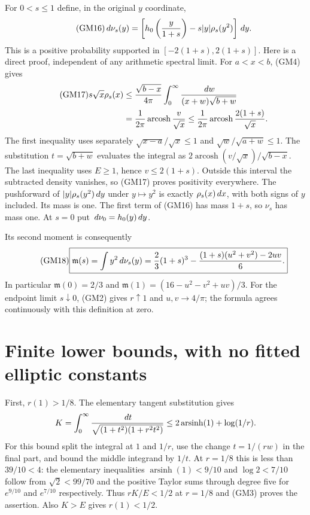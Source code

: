 For $0<s\le1$ define, in the original $y$ coordinate,
\begin{equation}\tag{GM16}
 \,d\nu_s(y)=\left[h_0\left(\frac y{1+s}\right)
                    -s|y|\rho_s(y^2)\right]\,d y.
\end{equation}
This is a positive probability supported in $[-2(1+s),2(1+s)]$.
Here is a direct proof, independent of any arithmetic spectral limit.
For $a<x<b$, (GM4) gives
\begin{align}\tag{GM17}
 s\sqrt x\rho_s(x)
 &\le\frac{\sqrt{b-x}}{4\pi}
          \int_0^\infty\frac{\,d w}{(x+w)\sqrt{b+w}}\notag\\
 &=\frac1{2\pi}\operatorname{arcosh}\frac v{\sqrt x}
 \le\frac1{2\pi}\operatorname{arcosh}\frac{2(1+s)}{\sqrt x}.\notag
\end{align}
The first inequality uses separately $\sqrt{x-a}/\sqrt x\le1$ and
$\sqrt w/\sqrt{a+w}\le1$. The substitution $t=\sqrt{b+w}$ evaluates
the integral as
$2\operatorname{arcosh}(v/\sqrt x)/\sqrt{b-x}$.
The last inequality uses $E\ge1$, hence $v\le2(1+s)$.
Outside this interval the subtracted density vanishes, so (GM17)
proves positivity everywhere. The pushforward of
$|y|\rho_s(y^2)\,d y$ under $y\mapsto y^2$ is exactly
$\rho_s(x)\,d x$, with both signs of $y$ included. Its mass is one.
The first term of (GM16) has mass $1+s$, so $\nu_s$ has mass one.
At $s=0$ put $\,d\nu_0=h_0(y)\,d y$.

Its second moment is consequently
\begin{equation}\tag{GM18}
 \boxed{\mathfrak m(s)=\int y^2\,d\nu_s(y)
 =\frac23(1+s)^3-\frac{(1+s)(u^2+v^2)-2uv}{6}.}
\end{equation}
In particular $\mathfrak m(0)=2/3$ and
$\mathfrak m(1)=(16-u^2-v^2+uv)/3$.
For the endpoint limit $s\downarrow0$, (GM2) gives
$r\uparrow1$ and $u,v\to4/\pi$; the formula agrees continuously
with this definition at zero.

\section{Finite lower bounds, with no fitted elliptic constants}
First, $r(1)>1/8$. The elementary tangent substitution gives
\[
 K=\int_0^\infty\frac{\,d t}{\sqrt{(1+t^2)(1+r^2t^2)}}
 \le2\operatorname{arsinh}(1)+\log(1/r).
\]
For this bound split the integral at $1$ and $1/r$, use the change
$t=1/(rw)$ in the final part, and bound the middle integrand by $1/t$.
At $r=1/8$ this is less than $39/10<4$: the elementary inequalities
$\operatorname{arsinh}(1)<9/10$ and $\log2<7/10$ follow from
$\sqrt2<99/70$ and the positive Taylor sums through degree five for
$e^{9/10}$ and $e^{7/10}$ respectively.
Thus $rK/E<1/2$ at $r=1/8$ and (GM3) proves the assertion.
Also $K>E$ gives $r(1)<1/2$.

